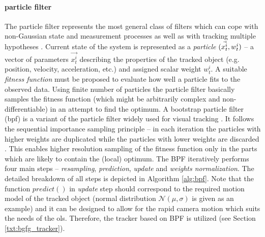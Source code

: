 \paragraph{particle filter} 
The particle filter represents the most general class of filters which can cope with non-Gaussian state and measurement processes as well as with tracking multiple hypotheses \cite{journals/cviu/BimboD11}. Current state of the system is represented as a \textit{particle} $(\vec{x_{t}^{i}},w_{t}^{i})$ -- a vector of parameters ${\vec{x_{t}^{i}}}$ describing the properties of the tracked object (e.g. position, velocity, acceleration, etc.) and assigned scalar weight $w_{t}^{i}$. A suitable \textit{fitness function} must be proposed to evaluate how well a particle fits to the observed data. Using finite number of particles the particle filter basically samples the fitness function (which might be arbitrarily complex and non-differentiable) in an attempt to find the optimum. A bootstrap particle filter (\gls{bpf}) is a variant of the particle filter widely used for visual tracking \cite{Isard98condensation}. It follows the sequential importance sampling principle -- in each iteration the particles with higher weights are duplicated while the particles with lower weights are discarded \cite{doucet2001sequential}. This enables higher resolution sampling of the fitness function only in the parts which are likely to contain the (local) optimum. The BPF iteratively performs four main steps -- \textit{resampling}, \textit{prediction}, \textit{update} and \textit{weights normalization}. The detailed breakdown of all steps is depicted in Algorithm \ref{alg:bpf}. Note that the function $predict()$ in \textit{update} step should correspond to the required motion model of the tracked object (normal distribution $\mathcal{N}(\mu, \sigma)$ is given as an example) and it can be designed to allow for the rapid camera motion which suits the needs of the \gls{ols}. Therefore, the tracker based on BPF is utilized (see Section \ref{txt:bgfg_tracker}).

